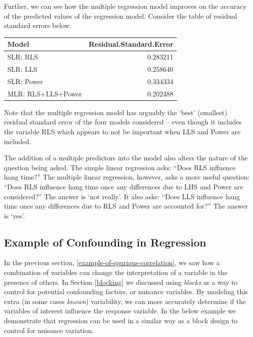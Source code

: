 \documentclass[
]{book}
\begin{document}
Further, we can see how the multiple regression model improves on the accuracy of the predicted values of the regression model.
Consider the table of residual standard errors below.

\begin{table}
\centering
\begin{tabular}[t]{l|r}
\hline
Model & Residual.Standard.Error\\
\hline
SLR: RLS & 0.283211\\
\hline
SLR: LLS & 0.258640\\
\hline
SLR: Power & 0.334334\\
\hline
MLR: RLS+LLS+Power & 0.202488\\
\hline
\end{tabular}
\end{table}

Note that the multiple regression model has arguably the `best' (smallest) residual standard error of the four models considered -- even though it includes the variable RLS which appears to not be important when LLS and Power are included.

The addition of a multiple predictors into the model also alters the nature of the question being asked.
The simple linear regression asks: ``Does RLS influence hang time?''
The multiple linear regression, however, asks a more useful question: ``Does RLS influence hang time once any differences due to LHS and Power are considered?''
The answer is `not really'.
It also asks: ``Does LLS influence hang time once any differences due to RLS and Power are accounted for?''
The answer is `yes'.

\hypertarget{example-of-confounding-in-regression}{%
\subsection{Example of Confounding in Regression}\label{example-of-confounding-in-regression}}

In the previous section, \ref{example-of-spurious-correlation}, we saw how a combination of variables can change the interpretation of a variable in the presence of others.
In Section \ref{blocking} we discussed using \emph{blocks} as a way to control for potential confounding factors, or nuisance variables.
By modeling this extra (in some cases \emph{known}) variability, we can more accurately determine if the variables of interest influence the response variable.
In the below example we demonstrate that regression can be used in a similar way as a block design to control for nuisance variation.
\end{document}

